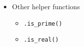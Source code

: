 \documentclass{article}
\newcommand{\code}{\texttt}
\begin{document}
\begin{itemize}
\begin{itemize}
	\end{itemize}
	\item Other helper functions
	\begin{itemize}
		\item \code{.is\_prime()}
		\item \code{.is\_real()}
	\end{itemize}
\end{itemize}
\end{document}
